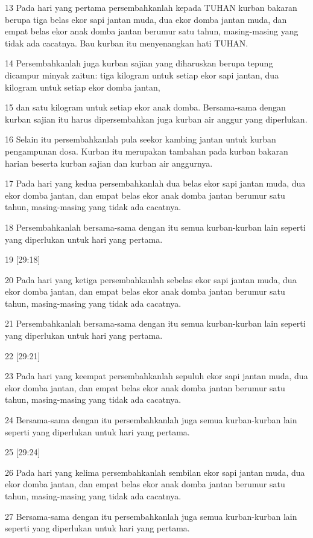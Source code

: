 \par 13 Pada hari yang pertama persembahkanlah kepada TUHAN kurban bakaran berupa tiga belas ekor sapi jantan muda, dua ekor domba jantan muda, dan empat belas ekor anak domba jantan berumur satu tahun, masing-masing yang tidak ada cacatnya. Bau kurban itu menyenangkan hati TUHAN.
\par 14 Persembahkanlah juga kurban sajian yang diharuskan berupa tepung dicampur minyak zaitun: tiga kilogram untuk setiap ekor sapi jantan, dua kilogram untuk setiap ekor domba jantan,
\par 15 dan satu kilogram untuk setiap ekor anak domba. Bersama-sama dengan kurban sajian itu harus dipersembahkan juga kurban air anggur yang diperlukan.
\par 16 Selain itu persembahkanlah pula seekor kambing jantan untuk kurban pengampunan dosa. Kurban itu merupakan tambahan pada kurban bakaran harian beserta kurban sajian dan kurban air anggurnya.
\par 17 Pada hari yang kedua persembahkanlah dua belas ekor sapi jantan muda, dua ekor domba jantan, dan empat belas ekor anak domba jantan berumur satu tahun, masing-masing yang tidak ada cacatnya.
\par 18 Persembahkanlah bersama-sama dengan itu semua kurban-kurban lain seperti yang diperlukan untuk hari yang pertama.
\par 19 [29:18]
\par 20 Pada hari yang ketiga persembahkanlah sebelas ekor sapi jantan muda, dua ekor domba jantan, dan empat belas ekor anak domba jantan berumur satu tahun, masing-masing yang tidak ada cacatnya.
\par 21 Persembahkanlah bersama-sama dengan itu semua kurban-kurban lain seperti yang diperlukan untuk hari yang pertama.
\par 22 [29:21]
\par 23 Pada hari yang keempat persembahkanlah sepuluh ekor sapi jantan muda, dua ekor domba jantan, dan empat belas ekor anak domba jantan berumur satu tahun, masing-masing yang tidak ada cacatnya.
\par 24 Bersama-sama dengan itu persembahkanlah juga semua kurban-kurban lain seperti yang diperlukan untuk hari yang pertama.
\par 25 [29:24]
\par 26 Pada hari yang kelima persembahkanlah sembilan ekor sapi jantan muda, dua ekor domba jantan, dan empat belas ekor anak domba jantan berumur satu tahun, masing-masing yang tidak ada cacatnya.
\par 27 Bersama-sama dengan itu persembahkanlah juga semua kurban-kurban lain seperti yang diperlukan untuk hari yang pertama.

